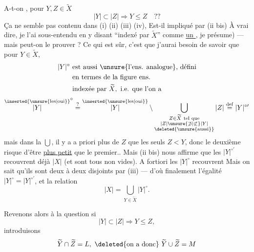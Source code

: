 A-t-on , pour $Y,Z\in\widetilde X$
\[
|Y|\subset|Z|\Longrightarrow Y\leq Z\quad ??
\]
Ça ne semble pas contenu dans (i) (ii) (iii) (iv),  Est-il impliqué par (ii bis)
 À vrai dire, je l'ai sous-entendu en y disant ``indexé par $\widetilde X$''  comme \uline{un }, je présume) --- mais peut-on le prouver ?  Ce qui est sûr, c'est que j'aurai besoin de savoir que pour $Y\in\widetilde X$,
\[
\begin{aligned}
|Y|^{\circ}\ &\text{est aussi \unsure{l'ens. analogue}, défini}\\
&\text{en termes de la figure ens.}\\
&\text{indexée par }\widetilde X,\text{ i.e. que l'on a}
\end{aligned}
\]
\[
\overset{\inserted{\unsure{\text{les}|\text{oui}}}}{|Y|}^{\circ}\overset{?}{=}\overset{\inserted{\unsure{\text{les}|\text{oui}}}}{|Y|}\setminus
\bigcup_{\substack{Z\in\widetilde X\ \text{tel que}\\ |Z|\unsure{\not\supset|\not\subset}|Y|\\\deleted{\unsure{\text{aussi}}}}}|Z|
\overset{\mathrm{def}}{=} |Y|^{\circ\prime}
\]
mais dans la $\bigcup$, il y a a priori  plus de $Z$ que  les seuls $Z<Y$, donc le  deuxième  risque d'être \uline{plus petit} que le premier.. Mais (ii bis)  nous affirme que les $|Y|^{\circ\prime}$ recouvrent déjà $|X|$ (et sont tous non vides). A fortiori les $|Y|^{\circ}$ recouvrent  Mais on sait qu'ils sont deux à deux disjoints par (iii) --- d'où finalement l'égalité $|Y|^{\circ}=|Y|^{\circ\prime}$, et la relation
\[
|X|=\bigcup_{Y\in\widetilde X}|Y|^{\circ}.
\]

Revenons alors à la question si
\[
|Y|\subset|Z|\Longrightarrow Y\leq Z,
\]
introduisons
\[
\widetilde Y\cap\widetilde Z=L,\ \deleted{\text{on a donc}}\ \widetilde Y\cup\widetilde Z=M
\]


